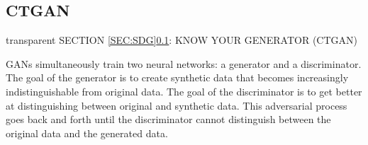 \documentclass[t,8pt,utfx8]{beamer}
\begin{document}
\begin{spacing}{1.25}


\subsection{CTGAN}\label{sec:sdg_ctgan}
\begin{frame}[c,plain]
\vskip-4mm
\begin{beamercolorbox}[wd=\boxwidth,ht=22.11mm]{transparent}%
    \vfill%
    \leftinsert%
    \MakeUppercase{Section \ref{sec:sdg}\ref{sec:sdg_ctgan}: Know your generator (CTGAN)} %
\end{beamercolorbox}
\vskip-3mm

GANs simultaneously train two neural networks: a generator and a discriminator. The goal of the generator is to create synthetic data that becomes increasingly indistinguishable from original data. The goal of the discriminator is to get better at distinguishing between original and synthetic data. This adversarial process goes back and forth until the discriminator cannot distinguish between the original data and the generated data.



\end{frame}
\end{spacing}
\end{document}
